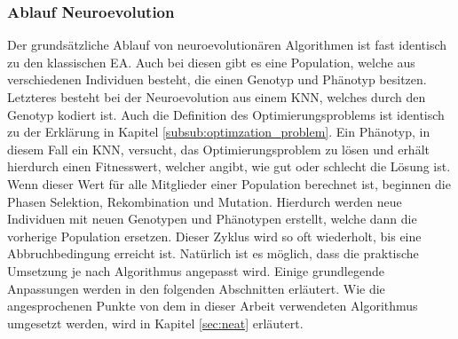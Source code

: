 \subsubsection{Ablauf Neuroevolution}
Der grundsätzliche Ablauf von neuroevolutionären Algorithmen ist fast identisch zu den klassischen \ac{EA}. Auch bei diesen gibt es eine Population, welche aus verschiedenen Individuen besteht, die einen Genotyp und Phänotyp besitzen. Letzteres besteht bei der Neuroevolution aus einem \ac{KNN}, welches durch den Genotyp kodiert ist. Auch die Definition des Optimierungsproblems ist identisch zu der Erklärung in Kapitel \ref{subsub:optimzation_problem}. Ein Phänotyp, in diesem Fall ein \ac{KNN}, versucht, das Optimierungsproblem zu lösen und erhält hierdurch einen Fitnesswert, welcher angibt, wie gut oder schlecht die Lösung ist. Wenn dieser Wert für alle Mitglieder einer Population berechnet ist, beginnen die Phasen Selektion, Rekombination und Mutation. Hierdurch werden neue Individuen mit neuen Genotypen und Phänotypen erstellt, welche dann die vorherige Population ersetzen. Dieser Zyklus wird so oft wiederholt, bis eine Abbruchbedingung erreicht ist. Natürlich ist es möglich, dass die praktische Umsetzung je nach Algorithmus angepasst wird. Einige grundlegende Anpassungen werden in den folgenden Abschnitten erläutert. Wie die angesprochenen Punkte von dem in dieser Arbeit verwendeten Algorithmus umgesetzt werden, wird in Kapitel \ref{sec:neat} erläutert.


